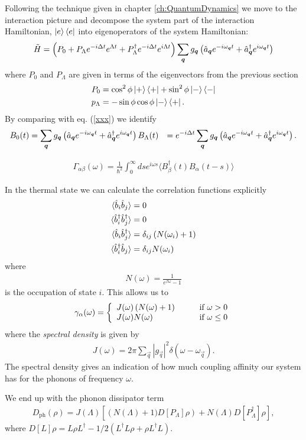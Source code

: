Following the technique given in chapter \ref{ch:QuantumDynamics} we move to the interaction picture and decompose the system part of the interaction Hamiltonian, $\left\vert e\right\rangle\left\langle e\right\vert$ into eigenoperators of the system Hamiltonian:
\begin{align}
  \tilde{H} = \left(P_0 + P_\Lambda e^{-i\Delta t}e^{\Lambda t} + P^\dagger_\Lambda e^{-i\Delta t} e^{i\Lambda t}\right)\sum_{{\boldsymbol{q}}}g_{{\boldsymbol{q}}}\left(\hat{a}_{{\boldsymbol{q}}}e^{-i\omega_{{\boldsymbol{q}}} t} + \hat{a}^\dagger_{{\boldsymbol{q}}} e^{i\omega_{{\boldsymbol{q}}} t} \right)
\end{align}
where $P_0$ and $P_\Lambda$ are given in terms of the eigenvectors from the previous section
\begin{align}
  P_0 &= \cos^2\phi \left\vert+\right\rangle\left\langle +\right\vert + \sin^2\phi \left\vert-\right\rangle\left\langle -\right\vert \\
  p_\Lambda &= -\sin\phi \cos\phi \left\vert-\right\rangle\left\langle +\right\vert.
\end{align}
By comparing with eq. (\ref{xxx}) we identify
\begin{align}
  B_0(t) &= \sum_{{\boldsymbol{q}}} g_{{\boldsymbol{q}}} \left(\hat{a}_{{\boldsymbol{q}}} e^{-i\omega_{{\boldsymbol{q}}} t} + \hat{a}^\dagger_{{\boldsymbol{q}}} e^{i\omega_{{\boldsymbol{q}}} t}\right)
  B_\Lambda(t) &= e^{-i\Delta t}\sum_{{\boldsymbol{q}}} g_{{\boldsymbol{q}}} \left(\hat{a}_{{\boldsymbol{q}}} e^{-i\omega_{{\boldsymbol{q}}} t} + \hat{a}^\dagger_{{\boldsymbol{q}}} e^{i\omega_{{\boldsymbol{q}}} t}\right).
\end{align}

\begin{align}
  \Gamma_{\alpha\beta}(\omega) = \frac{1}{\hbar^2}\int_0^\infty ds e^{i\omega s}\langle B^\dagger_\beta(t) B_\alpha(t-s)\rangle
\end{align}

In the thermal state we can calculate the correlation functions explicitly
\begin{align}
  \langle \hat{b}_i \hat{b}_j \rangle &= 0 \\
  \langle \hat{b}^\dagger_i \hat{b}^\dagger_j \rangle &= 0 \\
  \langle \hat{b}_i \hat{b}^\dagger_j \rangle &= \delta_{ij} \left( N(\omega_i) +1 \right) \\
  \langle \hat{b}^\dagger_i \hat{b}_j \rangle &= \delta_{ij} N(\omega_i)
\end{align}
where
\begin{align}
  N(\omega) = \frac{1}{e^{\beta \omega} - 1}
\end{align}
is the occupation of state $i$. This allows us to 
\begin{align}
  \gamma_\alpha(\omega) = \left\{
    \begin{array}{l l}
    J(\omega)\left(N(\omega) + 1\right) & \qquad \text{if $\omega > 0$}\\
    J(\omega)N(\omega) & \qquad \text{if $\omega \leq 0$}
  \end{array} \right.
\end{align}
where the \textit{spectral density} is given by
\begin{align}
  J(\omega) = 2\pi \sum_\vec{q} |g_\vec{q}|^2 \delta(\omega-\omega_\vec{q}).
\end{align}
The spectral density gives an indication of how much coupling affinity our system has for the phonons of frequency $\omega$.

We end up with the phonon dissipator term
\begin{align}
  D_\text{ph}(\rho) = J(\Lambda)\left[\left(N(\Lambda) + 1)D[P_\Lambda]\rho\right) + N(\Lambda)D[P^\dagger_\Lambda]\rho \right],
\end{align}
where $D[L]\rho = L\rho L^\dagger -1/2(L^\dagger L\rho + \rho L^\dagger L)$.

